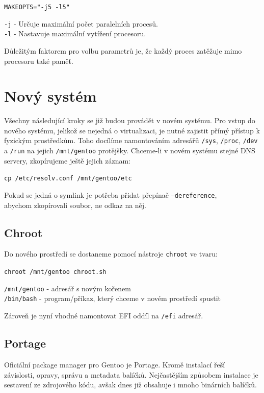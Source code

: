 \documentclass[12pt,a4paper,twoside,]{article}
\begin{document}
{{{{{{{\texttt{MAKEOPTS="-j5 -l5"}

\hspace{-1.5em}\texttt{-j} - Určuje maximální počet paralelních procesů.\\
\texttt{-l} - Nastavuje maximální vytížení procesoru.

\hspace{-1.5em}Důležitým faktorem pro volbu parametrů je, že každý proces zatěžuje mimo procesoru také paměť.

\newpage
\section{\textsf{Nový systém}}
Všechny následující kroky se již budou provádět v novém systému.
Pro vstup do nového systému, jelikož se nejedná o virtualizaci, je nutné zajistit přímý přístup k fyzickým prostředkům.
Toho docílíme namontováním adresářů \texttt{/sys}, \texttt{/proc}, \texttt{/dev} a \texttt{/run} na jejich \texttt{/mnt/gentoo} protějšky. Chceme-li v novém 
systému stejné DNS servery, zkopírujeme ještě jejich záznam: 

\texttt{cp /etc/resolv.conf /mnt/gentoo/etc} 

\hspace{-1.5em}Pokud se jedná o symlink je potřeba přidat přepínač  \texttt{--dereference}, \\
abychom zkopírovali soubor, ne odkaz na něj. 
\subsection{\textsf{Chroot}}
Do nového prostředí se dostaneme pomocí nástroje \texttt{chroot} ve tvaru:

\texttt{chroot /mnt/gentoo chroot.sh}

\hspace{-1.5em}\texttt{/mnt/gentoo} - adresář s novým kořenem\\
\texttt{/bin/bash} - program/příkaz, který chceme v novém prostředí spustit

\hspace{-1.5em}Zároveň je nyní vhodné namontovat EFI oddíl na \texttt{/efi} adresář.
\subsection{\textsf{Portage}}
Oficiální package manager pro Gentoo je Portage. Kromě instalací řeší \\závislosti, opravy, správu a metadata balíčků.
Nejčastějším způsobem instalace je \\sestavení ze zdrojového kódu, avšak dnes již obsahuje i mnoho binárních balíčků.
}}}}}}}
\end{document}
